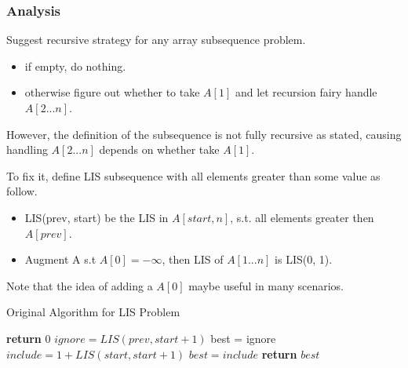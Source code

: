 \subsubsection{Analysis}
Suggest recursive strategy for any array subsequence problem.
\begin{itemize}
    \item if empty, do nothing.
    \item otherwise figure out whether to take $A[1]$ and let recursion fairy handle $A[2...n]$.
\end{itemize}

However, the definition of the subsequence is not fully recursive as stated, causing handling $A[2...n]$ depends on whether take $A[1]$.

To fix it, define LIS subsequence with all elements greater than some value as follow.

\begin{itemize}
    \item LIS(prev, start) be the LIS in $A[start, n]$, s.t. all elements greater then $A[prev]$.
    \item Augment A s.t $A[0] = -\infty$, then LIS of $A[1...n]$ is LIS(0, 1).
\end{itemize}

Note that the idea of adding a $A[0]$ maybe useful in many scenarios.

\begin{algorithm}[H]
\caption{Original Algorithm for LIS Problem}\label{ori_lis_alg}
\begin{algorithmic}[1]
 
    \State \textbf{return} {$0$}
\EndIf
\State $ignore = LIS(prev, start +1)$
\State best = ignore
    \State $include = 1 + LIS(start, start+1)$
        \State $best = include$
    \EndIf
\EndIf
\State \textbf{return} {$best$}
\EndProcedure
\end{algorithmic}
\end{algorithm}
